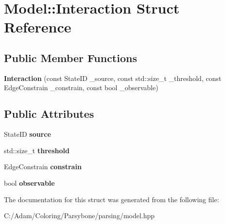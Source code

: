 \hypertarget{struct_model_1_1_interaction}{\section{Model\-:\-:Interaction Struct Reference}
\label{struct_model_1_1_interaction}
}
\subsection*{Public Member Functions}
\begin{DoxyCompactItemize}
\item 
\hypertarget{struct_model_1_1_interaction_aa4890043c70a73b630342dc8699d1d8b}{{\bfseries Interaction} (const State\-I\-D \-\_\-source, const std\-::size\-\_\-t \-\_\-threshold, const Edge\-Constrain \-\_\-constrain, const bool \-\_\-observable)}\label{struct_model_1_1_interaction_aa4890043c70a73b630342dc8699d1d8b}

\end{DoxyCompactItemize}
\subsection*{Public Attributes}
\begin{DoxyCompactItemize}
\item 
\hypertarget{struct_model_1_1_interaction_a6b1e4695b14c3e29d819489b8242c916}{State\-I\-D {\bfseries source}}\label{struct_model_1_1_interaction_a6b1e4695b14c3e29d819489b8242c916}

\item 
\hypertarget{struct_model_1_1_interaction_ad25a25987461269dcdb8f65372cb29bc}{std\-::size\-\_\-t {\bfseries threshold}}\label{struct_model_1_1_interaction_ad25a25987461269dcdb8f65372cb29bc}

\item 
\hypertarget{struct_model_1_1_interaction_a0d77cc99f52ea7fc8cc6dad3d145a98f}{Edge\-Constrain {\bfseries constrain}}\label{struct_model_1_1_interaction_a0d77cc99f52ea7fc8cc6dad3d145a98f}

\item 
\hypertarget{struct_model_1_1_interaction_afceb2f81791f446a9fd10b5cf97b3bb3}{bool {\bfseries observable}}\label{struct_model_1_1_interaction_afceb2f81791f446a9fd10b5cf97b3bb3}

\end{DoxyCompactItemize}


The documentation for this struct was generated from the following file\-:\begin{DoxyCompactItemize}
\item 
C\-:/\-Adam/\-Coloring/\-Parsybone/parsing/model.\-hpp\end{DoxyCompactItemize}
